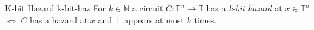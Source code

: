 
\begin{definitionbox}{K-bit Hazard \cite{ikenmeyer_ComplexityHazardfreeCircuits_2019}}{k-bit-haz}
    For $k \in \mathbb{N}$ a circuit $C: \mathbb{T}^n \to \mathbb{T}$ has a \textit{k-bit hazard} at $x \in \mathbb{T}^n$
    $\iff$ $C$ has a hazard at $x$ and $\bot$ appears at most $k$ times.
\end{definitionbox}
%
%
%

